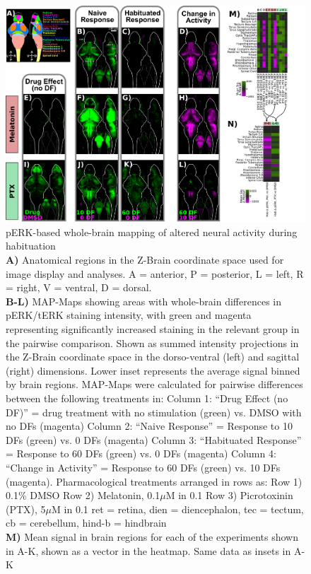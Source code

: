 \documentclass[9pt,lineno]{RandlettLab_elife}
\begin{document}
\begin{figure}
\begin{fullwidth}
\begin{center}
\includegraphics[width=0.93\linewidth]{Figure4-pERKResults.png}
\caption{
pERK-based whole-brain mapping of altered neural activity during habituation
\\ \textbf{A)} Anatomical regions in the Z-Brain coordinate space used for image display and analyses. A = anterior, P = posterior, L = left, R = right, V = ventral, D = dorsal. 
\\ \textbf{B-L)} MAP-Maps showing areas with whole-brain differences in pERK/tERK staining intensity, with green and magenta representing significantly increased staining in the relevant group in the pairwise comparison. Shown as summed intensity projections in the Z-Brain coordinate space in the dorso-ventral (left) and sagittal (right) dimensions. Lower inset represents the average signal binned by brain regions. MAP-Maps were calculated for pairwise differences between the following treatments in:
Column 1: “Drug Effect (no DF)” = drug treatment with no stimulation (green) vs. DMSO with no DFs (magenta)
Column 2: “Naive Response” = Response to 10 DFs (green) vs. 0 DFs (magenta)
Column 3: “Habituated Response” = Response to 60 DFs (green) vs. 0 DFs (magenta)
Column 4:  “Change in Activity” = Response to 60 DFs (green) vs. 10 DFs (magenta). 
Pharmacological treatments arranged in rows as: 
Row 1) 0.1\% DMSO
Row 2) Melatonin, 0.1$\mu$M in 0.1%
Row 3)  Picrotoxinin (PTX), 5$\mu$M in 0.1%
ret = retina, dien = diencephalon, tec = tectum, cb = cerebellum, hind-b = hindbrain
\\ \textbf{M)} Mean signal in brain regions for each of the experiments shown in A-K, shown as a vector in the heatmap. Same data as insets in A-K
}
\end{center}
\end{fullwidth}
\end{figure}
\end{document}
